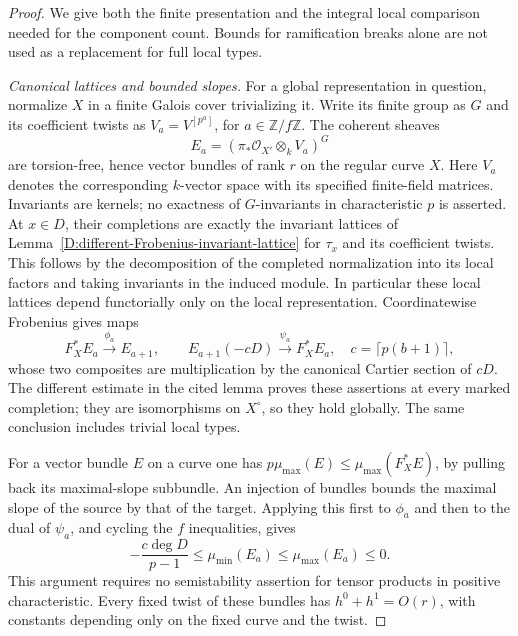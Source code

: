 \begin{proof}
We give both the finite presentation and the integral local
comparison needed for the component count. Bounds for ramification
breaks alone are not used as a replacement for full local types.

\emph{Canonical lattices and bounded slopes.}
For a global representation in question, normalize $X$ in a finite
Galois cover trivializing it. Write its finite group as $G$ and its
coefficient twists as $V_a=V^{[p^a]}$, for $a\in\mathbb Z/f\mathbb Z$.
The coherent sheaves
\[
                 E_a=(\pi_*\mathcal O_{X'}\otimes_k V_a)^G
 \tag{D.CL.5}
\]
are torsion-free, hence vector bundles of rank $r$ on the regular
curve $X$. Here $V_a$ denotes the corresponding $k$-vector space
with its specified finite-field matrices. Invariants are kernels;
no exactness of $G$-invariants in characteristic $p$ is asserted.
At $x\in D$, their completions are exactly the invariant lattices
of Lemma~\ref{D:different-Frobenius-invariant-lattice} for $\tau_x$
and its coefficient twists. This follows by the decomposition of
the completed normalization into its local factors and taking
invariants in the induced module. In particular these local
lattices depend functorially only on the local representation.
Coordinatewise Frobenius gives maps
\[
 F_X^*E_a\xrightarrow{\phi_a}E_{a+1},\qquad
 E_{a+1}(-cD)\xrightarrow{\psi_a}F_X^*E_a,
 \quad c=\lceil p(b+1)\rceil,
 \tag{D.CL.6}
\]
whose two composites are multiplication by the canonical Cartier
section of $cD$. The different estimate in the cited lemma proves
these assertions at every marked completion; they are isomorphisms
on $X^\circ$, so they hold globally. The same conclusion includes
trivial local types.

For a vector bundle $E$ on a curve one has
$p\mu_{\max}(E)\leq\mu_{\max}(F_X^*E)$, by pulling back its
maximal-slope subbundle. An injection of bundles bounds the maximal
slope of the source by that of the target. Applying this first to
$\phi_a$ and then to the dual of $\psi_a$, and cycling the $f$
inequalities, gives
\[
 -\frac{c\deg D}{p-1}\leq\mu_{\min}(E_a)
                  \leq\mu_{\max}(E_a)\leq0.
 \tag{D.CL.7}
\]
This argument requires no semistability assertion for tensor
products in positive characteristic. Every fixed twist of these
bundles has $h^0+h^1=O(r)$, with constants depending only on the
fixed curve and the twist.


\end{proof}

